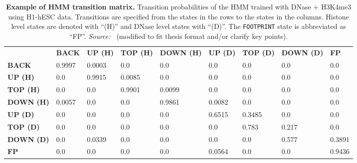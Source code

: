 \begin{table}[t]
\footnotesize
\begin{center}
\caption[Example of HMM transition matrix]{\textbf{Example of HMM transition matrix.} Transition probabilities of the HMM trained with DNase $+$ H3K4me3 using H1-hESC data. Transitions are specified from the states in the rows to the states in the columns. Histone level states are denoted with ``(H)'' and DNase level states with ``(D)''. The {\tt FOOTPRINT} state is abbreviated as ``FP''. \emph{Source:~\cite{gusmao2014}} (modified to fit thesis format and/or clarify key points).}
\label{tab:hmmtrans}
    \renewcommand{\arraystretch}{1.2}
    \begin{tabular}{ lllllllll }
        \hline
        & \textbf{BACK} & \textbf{UP (H)} & \textbf{TOP (H)} & \textbf{DOWN (H)} & \textbf{UP (D)}
        & \textbf{TOP (D)} & \textbf{DOWN (D)} & \textbf{FP} \\
        \textbf{BACK}     & 0.9997 & 0.0003 & 0.0    & 0.0    & 0.0    & 0.0    & 0.0   & 0.0    \\
        \textbf{UP (H)}   & 0.0    & 0.9915 & 0.0085 & 0.0    & 0.0    & 0.0    & 0.0   & 0.0    \\
        \textbf{TOP (H)}  & 0.0    & 0.0    & 0.9901 & 0.0099 & 0.0    & 0.0    & 0.0   & 0.0    \\
        \textbf{DOWN (H)} & 0.0057 & 0.0    & 0.0    & 0.9861 & 0.0082 & 0.0    & 0.0   & 0.0    \\
        \textbf{UP (D)}   & 0.0    & 0.0    & 0.0    & 0.0    & 0.6515 & 0.3485 & 0.0   & 0.0    \\
        \textbf{TOP (D)}  & 0.0    & 0.0    & 0.0    & 0.0    & 0.0    & 0.783  & 0.217 & 0.0    \\
        \textbf{DOWN (D)} & 0.0    & 0.0339 & 0.0    & 0.0    & 0.0    & 0.0    & 0.577 & 0.3891 \\
        \textbf{FP}       & 0.0    & 0.0    & 0.0    & 0.0    & 0.0564 & 0.0    & 0.0   & 0.9436 \\
        \hline
    \end{tabular}
\end{center}
\end{table}

